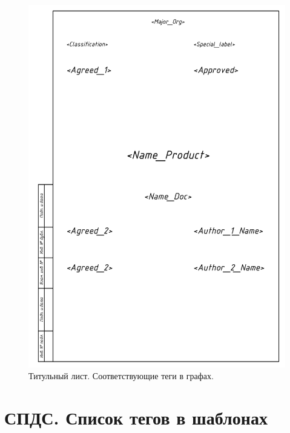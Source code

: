 \documentclass[14pt]{extreport}
\begin{document}
\begin{figure}[h]
	\centering
	\includegraphics[width=\textwidth]{ESKD_TIT_LIST_with_tagname}
    \caption{Титульный лист. Соответствующие теги в графах.\label{ESKD_TIT_LIST_with_tagname}}
\end{figure}

\chapter{СПДС. Список тегов в шаблонах}
~\label{APP:SPDS}
\end{document}
